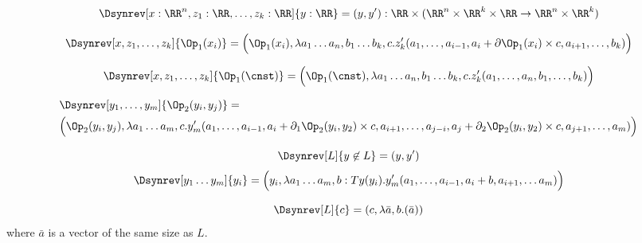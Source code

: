 \[\Dsynrev[x:\RR^n,z_1:\RR,\ldots,z_k:\RR]{y:\RR}=(y,y'):\RR\times(\RR^n\times \RR^k \times \RR \to \RR^n\times \RR^k)\]

\[\Dsynrev[x,z_1,\ldots,z_k]{\Op_1(x_i)}=\Big(\Op_1(x_i),\lambda a_1\ldots a_n,b_1\ldots b_k,c. z_k'(a_1,\ldots,a_{i-1},a_i+\partial\Op_1(x_i)\times c,a_{i+1},\ldots,b_k)\Big)\]

\[\Dsynrev[x,z_1,\ldots,z_k]{\Op_1(\cnst)}=\Big(\Op_1(\cnst),\lambda a_1\ldots a_n,b_1\ldots b_k,c. z_k'(a_1,\ldots,a_n,b_1,\ldots,b_k)\Big)\]

\begin{align*}
    &\Dsynrev[y_1,\ldots,y_m]{\Op_2(y_i,y_j)}=\\
    &\Big(\Op_2(y_i,y_j),\lambda a_1\ldots a_m,c.y_m'(a_1,\ldots, a_{i-1},a_i+\partial_1\Op_2(y_i,y_2)\times c,a_{i+1},\ldots,a_{j-i},a_j+\partial_2\Op_2(y_i,y_2)\times c,a_{j+1},\ldots, a_m)\Big)
  \end{align*}

  \[\Dsynrev[L]{y\not\in L}=(y,y')\]
\[\Dsynrev[y_1\ldots y_m]{y_i}=\Big(y_i,\lambda a_1\ldots a_m,b:Ty(y_i).y_m'(a_1,\ldots,a_{i-1},a_i+b,a_{i+1},\ldots a_m)\Big)\]

\[\Dsynrev[L]{c}=(c,\lambda \bar{a},b.(\bar{a}))\]
where $\bar{a}$ is a vector of the same size as $L$.